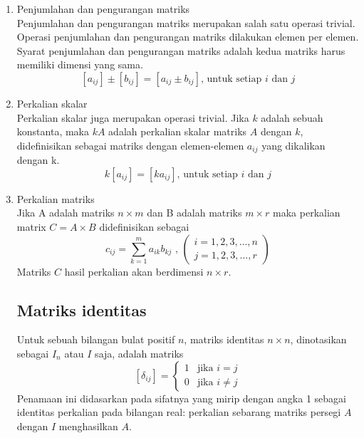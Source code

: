 \begin{enumerate}[label=\alph*.]

\item Penjumlahan dan pengurangan matriks\\Penjumlahan dan pengurangan matriks
merupakan salah satu operasi trivial. Operasi penjumlahan dan pengurangan
matriks dilakukan elemen per elemen. Syarat penjumlahan dan pengurangan matriks
adalah kedua matriks harus memiliki dimensi yang sama.
\begin{equation} \label{penjumlahan_matriks}
[a_{ij}] \pm [b_{ij}] = [a_{ij}\pm b_{ij}] \text{, untuk setiap }  i \text{ dan } j
\end{equation}

\item Perkalian skalar\\Perkalian skalar juga merupakan operasi trivial. Jika $k$ adalah sebuah
konstanta, maka $kA$ adalah perkalian skalar matriks $A$ dengan $k$,
didefinisikan sebagai matriks dengan elemen-elemen $a_{ij}$ yang
dikalikan dengan k.
\begin{equation}
k[a_{ij}] = [ka_{ij}] \text{, untuk setiap } i \text{ dan }j
\end{equation} 

\item Perkalian matriks\\Jika A adalah matriks $n \times m$ dan B adalah matriks $m \times r$ maka
perkalian matrix $C = A \times B$ didefinisikan sebagai
\begin{equation}
	c_{ij}=\sum_{k=1}^m{a_{ik}b_{kj}}\text{ , } \left(
	\begin{array}{l}
		i=1, 2, 3, \dotsc, n\\
		j=1, 2, 3, \dotsc, r
	\end{array}\right)
\end{equation} 
Matriks $C$ hasil perkalian akan berdimensi $n\times r$.

\subsection{Matriks identitas}
Untuk sebuah bilangan bulat positif $n$, matriks identitas $n \times{n}$,
dinotasikan sebagai $I_n$ atau $I$ saja, adalah matriks 
\begin{equation}
	\left[\delta_{ij}\right]=
	\begin{cases}
		1& \text{jika $i=j$}\\
		0& \text{jika $i \neq j$}
	\end{cases}
\end{equation}
Penamaan ini didasarkan pada sifatnya yang mirip dengan angka 1
sebagai identitas perkalian pada bilangan real: perkalian sebarang
matriks persegi $A$ dengan $I$ menghasilkan $A$.


\end{enumerate}
